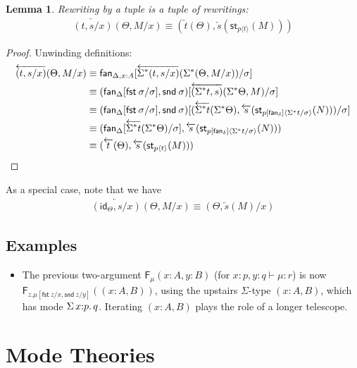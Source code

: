 \documentclass[10pt]{article}
\newtheorem{lemma}{Lemma}
\theoremstyle{definition}
\newcommand\dsd[1]{\ensuremath{\mathsf{#1}}}
\newcommand{\app}[2]{\ensuremath{#1 \: #2}}
\newcommand{\telety}[3]{\ensuremath{(#1{:}#2,#3)}}
\newcommand{\sigmacl}[3]{\ensuremath{\textnormal{$\Sigma$}\,#1{:}#2.\,#3}}
\newcommand{\fst}[1]{\app{\dsd{fst}}{#1}}
\newcommand{\snd}[1]{\app{\dsd{snd}}{#1}}
\newcommand\fan[1]{\ensuremath{\mathsf{fan}_{#1}}}
\newcommand{\id}{\mathsf{id}}
\newcommand{\rewrite}[2]{\overleftarrow{#1}(#2)}
\newcommand\F[2]{\ensuremath{\mathsf{F}_{#1}(#2)}}
\newcommand\StI[2]{\ensuremath{\mathsf{st}_{#1}(#2)}}
\newcommand\ap[2]{\ensuremath{#1 \langle #2 \rangle }}
\begin{document}
\begin{lemma}
Rewriting by a tuple is a tuple of rewritings:
\begin{align*}
\rewrite{(t, s/x)}{\Theta, M/x} \equiv (\rewrite{t}{\Theta}, \rewrite{s}{\StI{\ap{p}{t}}{M}})
\end{align*}
\end{lemma}
\begin{proof}
Unwinding definitions:
\begin{align*}
\rewrite{(t, s/x)}{\Theta, M/x}
&\equiv \fan{\Delta, x : A}[\rewrite{\ctxtuple{(t, s/x)}}{\ctxtuple{(\Theta, M/x)}}/\sigma] \\
&\equiv (\fan\Delta[\fst{\sigma}/\sigma], \snd{\sigma})[\rewrite{(\ctxtuple t, s)}{\ctxtuple\Theta, M}/\sigma] \\
&\equiv (\fan\Delta[\fst{\sigma}/\sigma], \snd{\sigma})[(\rewrite{\ctxtuple t}{\ctxtuple\Theta}, \rewrite{s}{\StI{\ap{p[\fan{\delta}]}{\ctxtuple t/\sigma}}{N}})/\sigma] \\
&\equiv (\fan\Delta[\rewrite{\ctxtuple t}{\ctxtuple\Theta}/\sigma], \rewrite{s}{\StI{\ap{p[\fan{\delta}]}{\ctxtuple t/\sigma}}{N}}) \\
&\equiv (\rewrite{t}{\Theta}, \rewrite{s}{\StI{\ap{p}{t}}{M}})
\end{align*}
\end{proof}

As a special case, note that we have
\begin{align*}
\rewrite{(\id_\Theta, s/x)}{\Theta, M/x} \equiv (\Theta, \rewrite{s}{M}/x)
\end{align*}

\subsection{Examples}

\begin{itemize}
\item 
The previous two-argument \F{\mu}{x:A,y:B} (for $x :p, y:q \vdash \mu :
r$) is now \F{z.\mu[\fst z/x,\snd z/y]}{\telety{x}{A}{B}}, using the
upstairs $\Sigma$-type ${\telety{x}{A}{B}}$, which has mode
$\sigmacl{x}{p}{q}$.  Iterating $\telety{x}{A}{B}$ plays the role of a
longer telescope.  
\end{itemize}

\section{Mode Theories}
\end{document}
